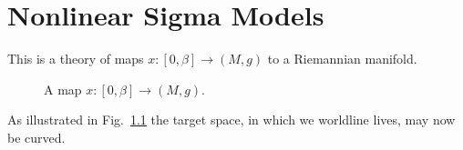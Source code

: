 
\chapter{Nonlinear Sigma Models}%
\label{cha:nonlinear_sigma_models}

This is a theory of maps $x \colon [0, \beta] \to (M, g)$  to a Riemannian manifold.
\begin{figure}[tbhp]
  \centering
  \def\svgwidth{0.4\columnwidth}
  
  \caption{A map $x\colon [0, \beta] \to (M, g)$.}
  \label{fig:l9f1}
\end{figure}
As illustrated in Fig.~\ref{fig:l9f1} the target space, in which we worldline lives, may now be curved.

